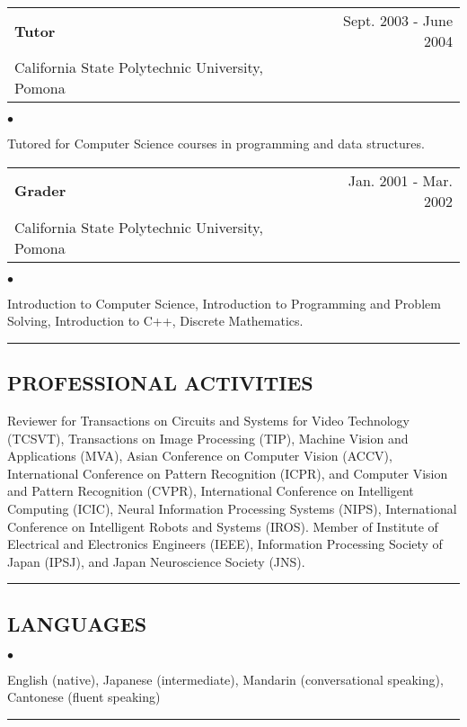 \documentclass[letterpaper,10pt]{article}
\newcommand{\myline}{ \rule{\textwidth}{0.01in} }
\newenvironment{smallitemize}{
  \begin{list}{$\bullet$}{
    \setlength{\leftmargin}{3.5em}
        \setlength{\topmargin}{-1.0em}
    \setlength{\itemsep}{-0.10em}
    \setlength{\parskip}{-0.8em}
    \setlength{\parsep}{0.10em}
  }
}{
  \end{list}
}
\renewcommand{\bf}{\bfseries}
\begin{document}
\begin{tabularx}{\textwidth}{b{}r}
        \bf{Tutor} & Sept. 2003 - June 2004\\
        {California State Polytechnic University, Pomona} &\\
\end{tabularx}
\begin{smallitemize} \normalfont
        \item Tutored for Computer Science courses in programming and data structures.
\end{smallitemize}
\begin{tabularx}{\textwidth}{b{}r}
        \bf{Grader} & Jan. 2001 - Mar. 2002\\
        {California State Polytechnic University, Pomona} &\\
\end{tabularx}
\begin{smallitemize} \normalfont
        \item Introduction to Computer Science, Introduction to Programming and Problem Solving, Introduction to C++, Discrete Mathematics.
\end{smallitemize}
\pagebreak
\myline
\subsection*{PROFESSIONAL ACTIVITIES}
Reviewer for Transactions on Circuits and Systems for Video Technology (TCSVT), Transactions on Image Processing (TIP), Machine Vision and Applications (MVA), Asian Conference on Computer Vision (ACCV), International Conference on Pattern Recognition (ICPR), and Computer Vision and Pattern Recognition (CVPR), International Conference on Intelligent Computing (ICIC), Neural Information Processing Systems (NIPS), International Conference on Intelligent Robots and Systems (IROS).
Member of Institute of Electrical and Electronics Engineers (IEEE), Information Processing Society of Japan (IPSJ),  and Japan Neuroscience Society (JNS).

\myline
\subsection*{LANGUAGES}
\vspace{0.08in}
\begin{smallitemize} \normalfont
        \item English (native), Japanese (intermediate), Mandarin (conversational speaking), Cantonese (fluent speaking)
\end{smallitemize}
\vspace{-0.05in}
\myline
\end{document}
